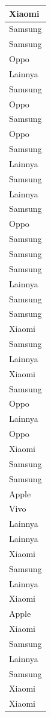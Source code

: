 \documentclass[
  letterpaper,
  DIV=11,
  numbers=noendperiod]{scrartcl}
\begin{document}
\begin{table}
\begin{tabular}[t]{l}
\hline
Xiaomi\\
\hline
Samsung\\
\hline
Samsung\\
\hline
Oppo\\
\hline
Lainnya\\
\hline
Samsung\\
\hline
Oppo\\
\hline
Samsung\\
\hline
Oppo\\
\hline
Samsung\\
\hline
Lainnya\\
\hline
Samsung\\
\hline
Lainnya\\
\hline
Samsung\\
\hline
Oppo\\
\hline
Samsung\\
\hline
Samsung\\
\hline
Samsung\\
\hline
Lainnya\\
\hline
Samsung\\
\hline
Samsung\\
\hline
Xiaomi\\
\hline
Samsung\\
\hline
Lainnya\\
\hline
Xiaomi\\
\hline
Samsung\\
\hline
Oppo\\
\hline
Lainnya\\
\hline
Oppo\\
\hline
Xiaomi\\
\hline
Samsung\\
\hline
Samsung\\
\hline
Apple\\
\hline
Vivo\\
\hline
Lainnya\\
\hline
Lainnya\\
\hline
Xiaomi\\
\hline
Samsung\\
\hline
Lainnya\\
\hline
Xiaomi\\
\hline
Apple\\
\hline
Xiaomi\\
\hline
Samsung\\
\hline
Lainnya\\
\hline
Samsung\\
\hline
Xiaomi\\
\hline
Xiaomi\\

\end{tabular}
\end{table}
\end{document}
